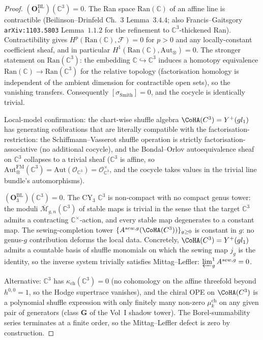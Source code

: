 \documentclass[11pt]{amsart}
\newcommand{\kch}{\kappa_{\mathrm{ch}}}
\newcommand{\cO}{\mathcal{O}}
\newcommand{\cF}{\mathcal{F}}
\newcommand{\Ran}{\mathrm{Ran}}
\newcommand{\Mbar}{\overline{\mathcal{M}}}
\newcommand{\bC}{\mathbb{C}}
\newcommand{\Aut}{\mathrm{Aut}}
\begin{document}
\begin{proof}
\emph{$(\mathbf{O}_1^{\mathrm{BL}})(\bC^3) = 0$.} The Ran space
$\Ran(\bC)$ of an affine line is contractible (Beilinson--Drinfeld
Ch.~$3$ Lemma~$3.4.4$; also Francis--Gaitsgory
\texttt{arXiv:1103.5803} Lemma~$1.1.2$ for the refinement to
$\bC^3$-thickened Ran). Contractibility gives $H^p(\Ran(\bC), \cF) = 0$
for $p > 0$ and any locally-constant coefficient sheaf, and in
particular $H^1(\Ran(\bC), \Aut_\otimes) = 0$. The stronger statement
on $\Ran(\bC^3)$: the embedding $\bC \hookrightarrow \bC^3$ induces
a homotopy equivalence $\Ran(\bC) \to \Ran(\bC^3)$ for the relative
topology (factorisation homology is independent of the ambient
dimension for contractible open sets), so the vanishing transfers.
Consequently $[\sigma_{\mathrm{Smith}}] = 0$, and the cocycle is
identically trivial.

Local-model confirmation: the chart-wise shuffle algebra
$\CoHA(\bC^3) = Y^+(\widehat{\mathfrak{gl}}_1)$ has generating
cofibrations that are literally compatible with the
factorisation-restriction: the Schiffmann--Vasserot shuffle
operation is strictly factorisation-associative (no additional
cocycle), and the Bondal--Orlov autoequivalence sheaf on $\bC^3$
collapses to a trivial sheaf ($\bC^3$ is affine, so
$\Aut_\otimes^{\mathrm{FM}}(\bC^3) = \Aut(\cO_{\bC^3}) =
\cO_{\bC^3}^\times$, and the cocycle takes values in the trivial
line bundle's automorphisms).

\emph{$(\mathbf{O}_3^{\mathrm{BL}})(\bC^3) = 0$.} The CY$_3$ $\bC^3$
is non-compact with no compact genus tower: the moduli
$\Mbar_{g,n}(\bC^3)$ of stable maps is trivial in the sense that
the target $\bC^3$ admits a contracting $\bC^\times$-action, and
every stable map degenerates to a constant map. The
sewing-completion tower $\{A^{\mathrm{sew}, g}(\CoHA(\bC^3))\}_{g \geq 0}$
is constant in $g$: no genus-$g$ contribution deforms the local
data. Concretely, $\CoHA(\bC^3) = Y^+(\widehat{\mathfrak{gl}}_1)$
admits a countable basis of shuffle monomials on which the sewing
map $j_g$ is the identity, so the inverse system trivially satisfies
Mittag--Leffler: $\varprojlim^1_g A^{\mathrm{sew}, g} = 0$.

Alternative: $\bC^3$ has $\kch(\bC^3) = 0$ (no cohomology on the
affine threefold beyond $h^{0,0} = 1$, so the Hodge supertrace
vanishes), and the chiral OPE on $\CoHA(\bC^3)$ is a polynomial
shuffle expression with only finitely many non-zero
$\mu^{\mathrm{ch}}_k$ on any given pair of generators (class
$\mathbf{G}$ of the Vol~I shadow tower). The Borel-summability
series terminates at a finite order, so the Mittag--Leffler defect
is zero by construction.
\end{proof}
\end{document}
